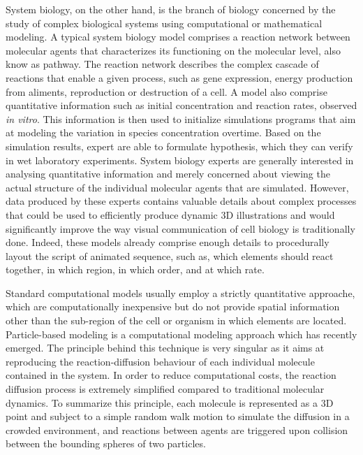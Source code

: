 System biology, on the other hand, is the branch of biology concerned by the study of complex biological systems using computational or mathematical modeling.
A typical system biology model comprises a reaction network between molecular agents that characterizes its functioning on the molecular level, also know as pathway.
The reaction network describes the complex cascade of reactions that enable a given process, such as gene expression, energy production from aliments, reproduction or destruction of a cell.
A model also comprise quantitative information such as initial concentration and reaction rates, observed \textit{in vitro}.
This information is then used to initialize simulations programs that aim at modeling the variation in species concentration overtime.
Based on the simulation results, expert are able to formulate hypothesis, which they can verify in wet laboratory experiments.
System biology experts are generally interested in analysing quantitative information and merely concerned about viewing the actual structure of the individual molecular agents that are simulated.
However, data produced by these experts contains valuable details about complex processes that could be used to efficiently produce dynamic 3D illustrations and would significantly improve the way visual communication of cell biology is traditionally done. 
Indeed, these models already comprise enough details to procedurally layout the script of animated sequence, such as, which elements should react together, in which region, in which order, and at which rate.

Standard computational models usually employ a strictly quantitative approache, which are computationally inexpensive but do not provide spatial information other than the sub-region of the cell or organism in which elements are located.
Particle-based modeling is a computational modeling approach which has recently emerged.
The principle behind this technique is very singular as it aims at reproducing the reaction-diffusion behaviour of each individual molecule contained in the system.
In order to reduce computational costs, the reaction diffusion process is extremely simplified compared to traditional molecular dynamics.
To summarize this principle, each molecule is represented as a 3D point and subject to a simple random walk motion to simulate the diffusion in a crowded environment, and reactions between agents are triggered upon collision between the bounding spheres of two particles.


